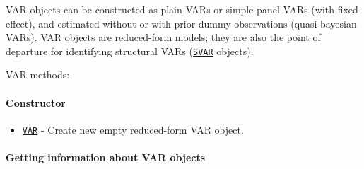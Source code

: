 

	VAR objects can be constructed as plain VARs or simple panel VARs (with
fixed effect), and estimated without or with prior dummy observations
(quasi-bayesian VARs). VAR objects are reduced-form models; they are
also the point of departure for identifying structural VARs
(\href{SVAR/Contents}{\texttt{SVAR}} objects).

VAR methods:

\paragraph{Constructor}

\begin{itemize}
\itemsep1pt\parskip0pt
\item
  \href{VAR/VAR}{\texttt{VAR}} - Create new empty reduced-form VAR
  object.
\end{itemize}

\paragraph{Getting information about VAR
objects}

